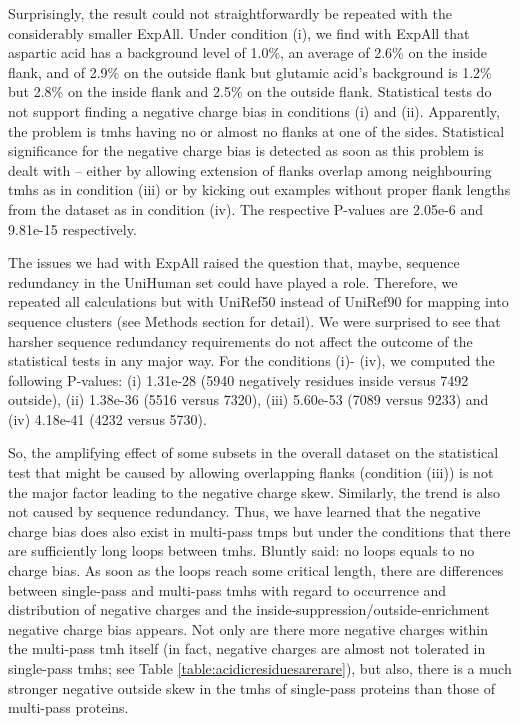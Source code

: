 Surprisingly, the result could not straightforwardly be repeated with the considerably smaller ExpAll. Under condition (i), we find with ExpAll that aspartic acid has a background level of 1.0\%, an average of 2.6\% on the inside flank, and of 2.9\% on the outside flank but glutamic acid’s background is 1.2\% but 2.8\% on the inside flank and 2.5\% on the outside flank. Statistical tests do not support finding a negative charge bias in conditions (i) and (ii). Apparently, the problem is \gls{tmh}s having no or almost no flanks at one of the sides. Statistical significance for the negative charge bias is detected as soon as this problem is dealt with – either by allowing extension of flanks overlap among neighbouring \gls{tmh}s as in condition (iii) or by kicking out examples without proper flank lengths from the dataset as in condition (iv). The respective P-values are 2.05e-6 and 9.81e-15 respectively.

The issues we had with ExpAll raised the question that, maybe, sequence redundancy in the UniHuman set could have played a role. Therefore, we repeated all calculations but with UniRef50 instead of UniRef90 for mapping into sequence clusters (see Methods section for detail). We were surprised to see that harsher sequence redundancy requirements do not affect the outcome of the statistical tests in any major way. For the conditions (i)- (iv), we computed the following P-values: (i) 1.31e-28 (5940 negatively residues inside versus 7492 outside), (ii) 1.38e-36 (5516 versus 7320), (iii) 5.60e-53 (7089 versus 9233) and (iv) 4.18e-41 (4232 versus 5730).

So, the amplifying effect of some subsets in the overall dataset on the statistical test that might be caused by allowing overlapping flanks (condition (iii)) is not the major factor leading to the negative charge skew. Similarly, the trend is also not caused by sequence redundancy. Thus, we have learned that the negative charge bias does also exist in multi-pass \gls{tmp}s but under the conditions that there are sufficiently long loops between \gls{tmh}s. Bluntly said: no loops equals to no charge bias. As soon as the loops reach some critical length, there are differences between single-pass and multi-pass \gls{tmh}s with regard to occurrence and distribution of negative charges and the inside-suppression/outside-enrichment negative charge bias appears. Not only are there more negative charges within the multi-pass \gls{tmh} itself (in fact, negative charges are almost not tolerated in single-pass \gls{tmh}s; see Table \ref{table:acidicresiduesarerare}), but also, there is a much stronger negative outside skew in the \gls{tmh}s of single-pass proteins than those of multi-pass proteins.

